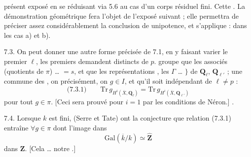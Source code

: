 \documentclass[11pt,a4paper]{article}
\begin{document}
présent exposé en se réduisant via 5.6 \struck{\ill{}} au cas d'un corps résiduel fini. Cette      .  La démonstration géométrique fera l'objet de l'exposé suivant ; elle permettra de préciser assez considérablement \struck{\ill{}} la conclusion de unipotence, et \struck{\ill{}} s'applique :   dans les cas a) et b).

7.3. On peut donner une autre forme précisée de 7.1, en y faisant varier le premier $\ell$, les  premiers  \struck{\ill{} \ill{}} demandent  distincts de $p$. \struck{\ill{} \ill{}} \add{$\Gamma$,} \struck{\ill{}} groupe    que les   associés (quotients de $\pi$) … $= s$, et que les représentations ,  les \og {} \fg{}   \ill{} $\Gamma$  \ill{}  \struck{\ill{}} … $\}$ de $\mathbf{Q}_{\ell}$, $\mathbf{Q}_{\ell'}$ ; \struck{\ill{}}  \add{\ill{}} une  commune des , on    précisément, \struck{\ill{}} on  \struck{\ill{}}    $g \in I$, et qu'il soit indépendant de $\ell \neq p$ :
\[ \text{(7.3.1)} \qquad \mathrm{Tr}\, g_{H^{i}(\overline{X}, \mathbf{Q}_{\ell})} = \mathrm{Tr}\, g_{H^{i}(\overline{X}, \mathbf{Q}_{\ell'})} \]
pour tout $g \in \pi$. [Ceci sera prouvé pour $i = 1$ par \struck{\ill{}}  les conditions de Néron.]  \ill{} \ill{} \ill{}.

7.4. Lorsque $k$ est fini, (Serre et Tate)  ont  la conjecture que  relation (7.3.1) entraîne  $\forall g \in \pi$ dont l'image dans
\[ \mathrm{Gal}(\overline{k}/k) \simeq \widehat{\mathbf{Z}} \]
\struck{\ill{}}  dans $\mathbf{Z}$. [Cela   … notre .]

\end{document}
